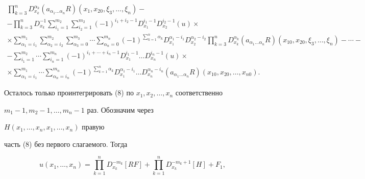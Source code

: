 \begin{multline}
\prod^{n}_{k=3}D^{\alpha_k}_{x_k}(a_{\alpha_1\dotsc\alpha_n}R) 


(x_1,x_{20},\xi_3,\dotsc,\xi_{n})- \\ 


% 


-\prod^{n}_{k=3} D^{-1}_{x_k}


\sum^{m_2}_{i_1=1} 


\sum^{m_2}_{i_2=1}(-1)^{i_1+i_2-1}D^{i_1-1}_{x_1} 


D^{i_2-1}_{x_2}(u)\times \\ 


% 


\times \sum^{m_1}_{\alpha_1=i_1}\sum^{m_2}_{\alpha_2=i_2} 


\sum^{m_3}_{\alpha_3=0}\dotsb\sum^{m_n}_{\alpha_n=0} 


(-1)^{\sum\limits^n_{k=1}\alpha_k}D^{\alpha_1-i_1}_{x_1} 


D^{\alpha_2-i_2}_{x_2} 


\prod^{n}_{k=3}D^{\alpha_k}_{x_k}(a_{\alpha_1\dotsc\alpha_n}R) 


(x_{10},x_{20},\xi_3,\dotsc,\xi_{n})-\dotsb- \\ 


%


-\sum^{m_2}_{i_1=1}\dotsb\sum^{m_n}_{i_n=1} 


(-1)^{i_1+\dotsb+i_n-1}D^{i_1-1}_{x_1}\dotsc 


D^{i_n-1}_{x_n}(u)\times\\


%


\times\sum^{m_1}_{\alpha_1=i_1}\dotsb\sum^{m_n}_{\alpha_n=i_n} 


(-1)^{\sum\limits^n_{k=1}\alpha_k}D^{\alpha_1-i_1}_{x_1}\dotsc 


D^{\alpha_n-i_n}_{x_n}(a_{\alpha_1\dotsc\alpha_n}R) 


(x_{10},x_{20},\dotsc,x_{n0}).


\end{multline} 


 


Осталось только проинтегрировать (8) по $x_1,x_2,\dotsc,x_n$ соответственно 


$m_1-1,m_2-1,\dotsc,m_n-1$ раз. Обозначим через 


$H(x_1,\dotsc,x_n,x_1,\dotsc,x_n)$ правую 


часть (8) без первого слагаемого. Тогда 


\begin{equation} 


u(x_1,\dotsc,x_n)=\prod^n_{k=1}D^{-m_k}_{x_k}[RF]+ 


\prod^n_{k=1}D^{-m_k+1}_{x_k}[H]+F_1, 


\end{equation} 


